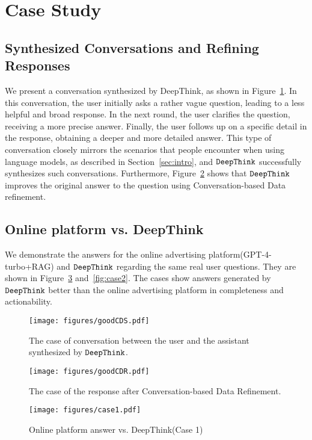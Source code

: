\section{Case Study}

\subsection{Synthesized Conversations and Refining Responses}
\label{sec:scrr}
We present a conversation synthesized by DeepThink, as shown in Figure~\ref{fig:goodCDS}. In this conversation, the user initially asks a rather vague question, leading to a less helpful and broad response. In the next round, the user clarifies the question, receiving a more precise answer. Finally, the user follows up on a specific detail in the response, obtaining a deeper and more detailed answer. This type of conversation closely mirrors the scenarios that people encounter when using language models, as described in Section~\ref{sec:intro}, and $\texttt{DeepThink}$ successfully synthesizes such conversations. Furthermore, Figure~\ref{fig:goodCDR} shows that $\texttt{DeepThink}$ improves the original answer to the question using Conversation-based Data refinement.

\subsection{Online platform vs. DeepThink}
We demonstrate the answers for the online advertising platform(GPT-4-turbo+RAG) and $\texttt{DeepThink}$ regarding the same real user questions. They are shown in Figure~\ref{fig:case1} and~\ref{fig:case2}. The cases show answers generated by $\texttt{DeepThink}$ better than the online advertising platform in completeness and actionability.



\begin{figure*}[htbp]
\centering
\texttt{[image: figures/goodCDS.pdf]}
    \caption{The case of conversation between the user and the assistant synthesized by $\texttt{DeepThink}$.}
    \label{fig:goodCDS}
\end{figure*}

\begin{figure*}[htbp]
\centering
\texttt{[image: figures/goodCDR.pdf]}
    \caption{The case of the response after Conversation-based Data Refinement.}
    \label{fig:goodCDR}
\end{figure*}

\begin{figure*}[htbp]
\centering
\texttt{[image: figures/case1.pdf]}
    \caption{Online platform answer vs. DeepThink(Case 1)}
    \label{fig:case1}
\end{figure*}

